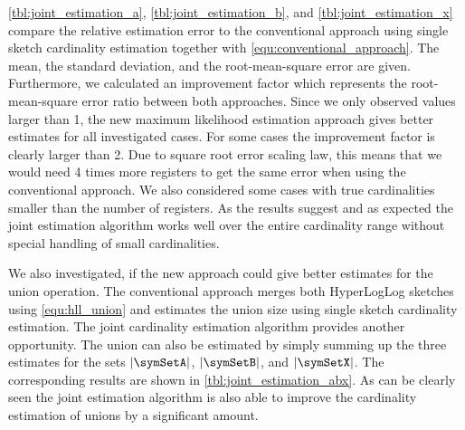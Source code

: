 \documentclass[a4paper]{scrartcl}
\begin{document}
\cref{tbl:joint_estimation_a}, \cref{tbl:joint_estimation_b}, and \cref{tbl:joint_estimation_x} compare the relative estimation error to the conventional approach using single sketch cardinality estimation together with \eqref{equ:conventional_approach}. The mean, the standard deviation, and the root-mean-square error are given. Furthermore, we calculated an improvement factor which represents the root-mean-square error ratio between both approaches. Since we only observed values larger than 1, the new maximum likelihood estimation approach gives better estimates for all investigated cases. For some cases the improvement factor is clearly larger than 2. Due to square root error scaling law, this means that we would need 4 times more registers to get the same error when using the conventional approach. We also considered some cases with true cardinalities smaller  than the number of registers. As the results suggest and as expected the joint estimation algorithm works well over the entire cardinality range without special handling of small cardinalities.

We also investigated, if the new approach could give better estimates for the union operation. The conventional approach merges both HyperLogLog sketches using \eqref{equ:hll_union} and estimates the union size using single sketch cardinality estimation. The joint cardinality estimation algorithm provides another opportunity. The union can also be estimated by simply summing up the three estimates for the sets $|\symSetA|$, $|\symSetB|$, and $|\symSetX|$. The corresponding results are shown in \cref{tbl:joint_estimation_abx}. As can be clearly seen the joint estimation algorithm is also able to improve the cardinality estimation of unions by a significant amount.
\end{document}
